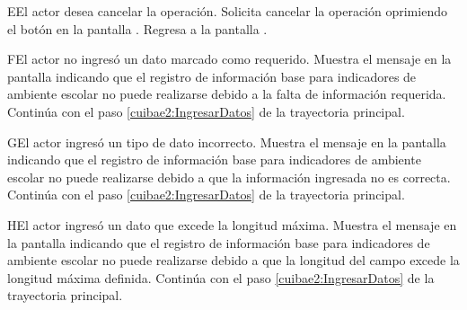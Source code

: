     \begin{UCtrayectoriaA}{E}{El actor desea cancelar la operación.}
    \UCpaso[\UCactor] Solicita cancelar la operación oprimiendo el botón  en la pantalla .
    \UCpaso[] Regresa a la pantalla . 
    \end{UCtrayectoriaA}
  
    \begin{UCtrayectoriaA}{F}{El actor no ingresó un dato marcado como requerido.}    
    \UCpaso[\UCsist] Muestra el mensaje  en la pantalla  indicando que el registro de información base para indicadores de ambiente escolar no puede realizarse debido a la falta de información requerida.
    \UCpaso[] Continúa con el paso \ref{cuibae2:IngresarDatos} de la trayectoria principal.     
    \end{UCtrayectoriaA}
 
        \begin{UCtrayectoriaA}{G}{El actor ingresó un tipo de dato incorrecto.}    
    \UCpaso[\UCsist] Muestra el mensaje  en la pantalla  indicando que el registro de información base para indicadores de ambiente escolar no puede realizarse debido a que la información ingresada no es correcta.
    \UCpaso[] Continúa con el paso \ref{cuibae2:IngresarDatos} de la trayectoria principal.     
    \end{UCtrayectoriaA}
    
            \begin{UCtrayectoriaA}{H}{El actor ingresó un dato que excede la longitud máxima.}    
    \UCpaso[\UCsist] Muestra el mensaje  en la pantalla  indicando que el registro de información base para indicadores de ambiente escolar no puede realizarse debido a que la longitud del campo excede la longitud máxima definida.
    \UCpaso[] Continúa con el paso \ref{cuibae2:IngresarDatos} de la trayectoria principal.     
    \end{UCtrayectoriaA}